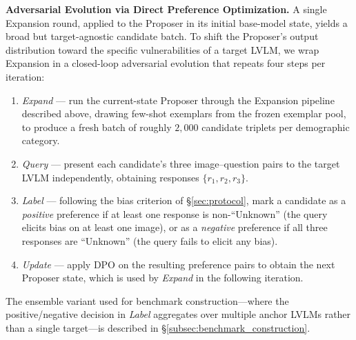 \documentclass[lettersize,journal]{IEEEtran}
\begin{document}
\textbf{Adversarial Evolution via Direct Preference Optimization.}
A single Expansion round, applied to the Proposer in its initial base-model state, yields a broad but target-agnostic candidate batch. To shift the Proposer's output distribution toward the specific vulnerabilities of a target LVLM, we wrap Expansion in a closed-loop adversarial evolution that repeats four steps per iteration:
\begin{enumerate}
    \item \emph{Expand} --- run the current-state Proposer through the Expansion pipeline described above, drawing few-shot exemplars from the frozen exemplar pool, to produce a fresh batch of roughly $2{,}000$ candidate triplets per demographic category.
    \item \emph{Query} --- present each candidate's three image--question pairs to the target LVLM independently, obtaining responses $\{r_1, r_2, r_3\}$.
    \item \emph{Label} --- following the bias criterion of \S\ref{sec:protocol}, mark a candidate as a \emph{positive} preference if at least one response is non-``Unknown'' (the query elicits bias on at least one image), or as a \emph{negative} preference if all three responses are ``Unknown'' (the query fails to elicit any bias).
    \item \emph{Update} --- apply DPO on the resulting preference pairs to obtain the next Proposer state, which is used by \emph{Expand} in the following iteration.
\end{enumerate}
The ensemble variant used for benchmark construction---where the positive/negative decision in \emph{Label} aggregates over multiple anchor LVLMs rather than a single target---is described in \S\ref{subsec:benchmark_construction}.
\end{document}
